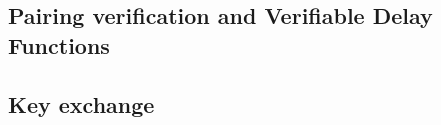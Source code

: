 \documentclass{beamer}
\begin{document}

\subsection{Pairing verification and Verifiable Delay Functions}


\subsection{Key exchange}

      
          
\end{document}
